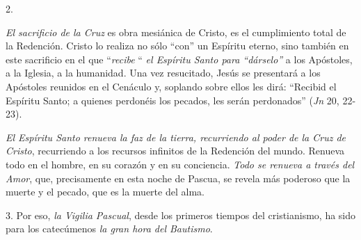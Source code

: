 			\begin{body}2. \begin{bodysmall} \end{bodysmall}\end{body}
			
			\begin{body}\textit{El sacrificio de la Cruz} es obra mesiánica de Cristo, es el cumplimiento total de la Redención. Cristo lo realiza no sólo “con” un Espíritu eterno, sino también en este sacrificio en el que “\textit{recibe} “ \textit{el Espíritu Santo para “dárselo”} a los Apóstoles, a la Iglesia, a la humanidad. Una vez resucitado, Jesús se presentará a los Apóstoles reunidos en el Cenáculo y, soplando sobre ellos les dirá: “Recibid el Espíritu Santo; a quienes perdonéis los pecados, les serán perdonados” (\textit{Jn} 20, 22-23). \end{body}
			
			\begin{body}\textit{El Espíritu Santo renueva la faz de la tierra, recurriendo al poder de la Cruz de Cristo}, recurriendo a los recursos infinitos de la Redención del mundo. Renueva todo en el hombre, en su corazón y en su conciencia. \textit{Todo se renueva a través del Amor}, que, precisamente en esta noche de Pascua, se revela más poderoso que la muerte y el pecado, que es la muerte del alma. \end{body}
			
			\begin{body}3. Por eso, \textit{la Vigilia Pascual}, desde los primeros tiempos del cristianismo, ha sido para los catecúmenos \textit{la gran hora del Bautismo}. \end{body}
			
			\begin{body}\begin{bodysmall}\end{bodysmall}\end{body}
			
